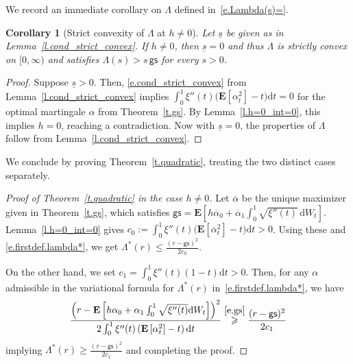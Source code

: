 \documentclass[11pt]{amsart}
\newtheorem{corollary}[proposition]{Corollary}
\theoremstyle{remark}
\theoremstyle{definition}
\numberwithin{equation}{section}
\numberwithin{proposition}{section}
\numberwithin{figure}{section}
\numberwithin{table}{section}
\newcommand{\EE}{\mathbf{E}}
\renewcommand{\leq}{\leqslant}
\renewcommand{\geq}{\geqslant}
\renewcommand{\bar}{\overline}
\newcommand{\Ll}{\left}
\newcommand{\Rr}{\right}
\renewcommand{\d}{\mathrm{d}}
\newcommand{\1}{\mathbf{1}}
\newcommand{\msf}{\mathsf}
\newcommand{\al}{\alpha}
\newcommand{\gs}{\msf {gs}}
\begin{document}
We record an immediate corollary on $\Lambda$ defined in~\eqref{e.Lambda(s)=}. 

\begin{corollary}[Strict convexity of $\Lambda$ at $h\neq 0$]
\label{c.bars.zero}
Let $\underline s$ be given as in Lemma~\ref{l.cond_strict_convex}. If $h\neq 0$, then $\underline s=0$ and thus $\Lambda$ is strictly convex on $[0,\infty)$ and satisfies $\Lambda(s)>s \, \gs$ for every $s>0$.
\end{corollary}

\begin{proof}
Suppose $\underline s>0$. Then, \eqref{e.cond_strict_convex} from Lemma~\ref{l.cond_strict_convex} implies $\int_0^1\xi''(t)\big(\EE\Ll[\alpha^2_t\Rr]-t\big)\d t = 0$ for the optimal martingale $\alpha$ from Theorem~\ref{t.gs}. By Lemma~\ref{l.h=0_int=0}, this implies $h=0$, reaching a contradiction. Now with $\underline s=0$, the properties of $\Lambda$ follow from Lemma~\ref{l.cond_strict_convex}.
\end{proof}

We conclude by proving Theorem~\ref{t.quadratic}, treating the two distinct cases separately.

\begin{proof}[Proof of Theorem~\ref{t.quadratic} in the case $h\neq0$]
Let $\bar\alpha$ be the unique maximizer given in Theorem~\ref{t.gs}, which satisfies $\gs = \EE \Ll[ h\bar\al_0+ \bar\al_1  \int_0^1 \sqrt{\xi''(t)} \, \d W_t \Rr]$.
Lemma~\ref{l.h=0_int=0} gives $c_0:= \int_0^1\xi''(t)\big(\EE\Ll[\bar\alpha^2_t\Rr]-t\big)\d t>0$. Using these and \eqref{e.firstdef.lambda*}, we get $\Lambda^*(r)\leq \frac{(r-\gs)^2}{2c_0}$.

On the other hand, we set $c_1 = \int_0^1\xi''(t)(1-t)\d t>0$. Then, for any $\alpha$ admissible in the variational formula for $\Lambda^*(r)$ in~\eqref{e.firstdef.lambda*}, we have
\begin{align*}
    \frac{\Ll(r-\EE\Ll[h\alpha_0+\alpha_1\int_0^1\sqrt{\xi''(t)}\d W_t\Rr]\Rr)^2}{2\int_0^1\xi''(t)\Ll(\EE\Ll[\alpha^2_t\Rr]-t\Rr)\d t}  \stackrel{\eqref{e.gs}}{\geq} \frac{(r-\gs)^2}{2c_1}
\end{align*}
implying $\Lambda^*(r)\geq \frac{(r-\gs)^2}{2c_1}$ and completing the proof.
\end{proof}
\end{document}
